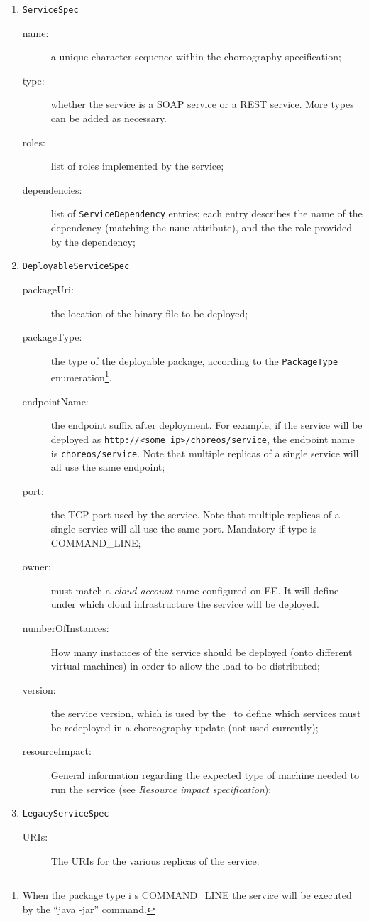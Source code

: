 \begin{enumerate}

\item \verb!ServiceSpec!
	\begin{description}
		\item [name:] a unique character sequence within the choreography specification;
		\item [type:] whether the service is a SOAP service or a REST service. More types can be added as necessary.
		\item [roles:] list of roles implemented by the service;
		\item [dependencies:] list of \verb!ServiceDependency! entries; each entry describes the name of the dependency (matching the \verb!name! attribute), and the the role provided by the dependency;
	\end{description}

\item \verb!DeployableServiceSpec!
	\begin{description}
		\item [packageUri:] the location of the binary file to be deployed;
		\item [packageType:] the type of the deployable package, according to the \verb!PackageType! enumeration\footnote{When the package type i    s COMMAND\_LINE the service will be executed by the ``java -jar'' command.}.
		\item [endpointName:] the endpoint suffix after deployment. For example, if the service will be deployed as \verb!http://<some_ip>/choreos/service!, the endpoint name is \verb!choreos/service!. Note that multiple replicas of a single service will all use the same endpoint;
		\item [port:] the TCP port used by the service. Note that multiple replicas of a single service will all use the same port. Mandatory if type is COMMAND\_LINE;
		\item [owner:] must match a \emph{cloud account} name configured on EE. It will define under which cloud infrastructure the service will be deployed.
		\item [numberOfInstances:] How many instances of the service should be deployed (onto different virtual machines) in order to allow the load to be distributed;
		\item [version:] the service version, which is used by the \ee\ to define which services must be redeployed in a choreography update (not used currently); 
		\item [resourceImpact:] General information regarding the expected type of machine needed to run the service (see \emph{Resource impact specification});
	\end{description}

\item \verb!LegacyServiceSpec!
	\begin{description}
		\item [URIs:] The URIs for the various replicas of the service.
	\end{description}

\end{enumerate}

